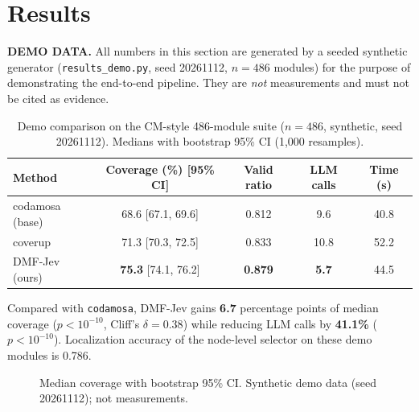 \documentclass[11pt]{article}
\begin{document}
\section{Results}
\label{sec:results}
\textcolor{warn}{\textbf{DEMO DATA.} All numbers in this section are generated by a seeded synthetic
generator (\texttt{results\_demo.py}, seed 20261112, $n=486$ modules) for the purpose of
demonstrating the end-to-end pipeline. They are \emph{not} measurements and must not be cited as evidence.}
\begin{table}[h]
\centering
\caption{Demo comparison on the CM-style 486-module suite ($n=486$, synthetic, seed 20261112).
Medians with bootstrap 95\% CI (1,000 resamples).}
\label{tab:cm}
\begin{tabular}{lcccc}
\toprule
Method & Coverage (\%) [95\% CI] & Valid ratio & LLM calls & Time (s) \\
\midrule
codamosa (base) & 68.6 [67.1, 69.6] & 0.812 & 9.6 & 40.8 \\
coverup & 71.3 [70.3, 72.5] & 0.833 & 10.8 & 52.2 \\
DMF-Jev (ours) & \textbf{75.3} [74.1, 76.2] & \textbf{0.879} & \textbf{5.7} & 44.5 \\
\bottomrule
\end{tabular}
\end{table}

Compared with \texttt{codamosa}, DMF-Jev gains \textbf{6.7} percentage points of median coverage
($p<10^{-10}$, Cliff's $\delta=0.38$) while reducing LLM calls by
\textbf{41.1\%} ($p<10^{-10}$). Localization accuracy of the
node-level selector on these demo modules is 0.786.

\begin{figure}[h]
\centering
{}
\caption{Median coverage with bootstrap 95\% CI. Synthetic demo data (seed 20261112); not measurements.}
\label{fig:bars}
\end{figure}
\end{document}
